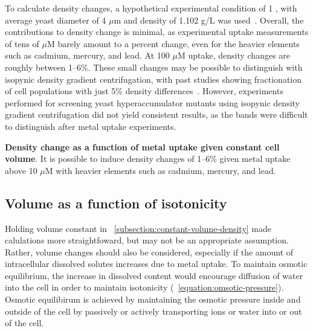 \documentclass[../main/main]{subfiles}
\begin{document}
To calculate density changes, a hypothetical experimental condition of 1 \OD{}, with average yeast diameter of 4 $\mu$m and density of 1.102 g/L was used~\cite{bryan2010measurement}. Overall, the contributions to density change is minimal, as experimental uptake measurements of tens of $\mu$M barely amount to a percent change, even for the heavier elements such as cadmium, mercury, and lead. At 100 $\mu$M uptake, density changes are roughly between 1--6\%. These small changes may be possible to distinguish with isopynic density gradient centrifugation, with past studies showing fractionation of cell populations with just 5\% density differences~\cite{baldwin1984,kjeldsen1999subcellular}. However, experiments performed for screening yeast hyperaccumulator mutants using isopynic density gradient centrifugation did not yield consistent results, as the bands were difficult to distinguish after metal uptake experiments.

\begin{table}[H]
	\centering
	
	\caption[Density change as a function of metal uptake given constant cell volume]
	{
		\textbf{Density change as a function of metal uptake given constant cell volume}.
		It is possible to induce density changes of 1--6\% given metal uptake above 10 $\mu$M with heavier elements such as cadmium, mercury, and lead.
	}
\end{table}

\subsection*{Volume as a function of isotonicity}
Holding volume constant in \SECTION~\ref{subsection:constant-volume-density} made calulations more straightfoward, but may not be an appropriate assumption. Rather, volume changes should also be considered, especially if the amount of intracellular dissolved solutes increases due to metal uptake. To maintain osmotic equilibrium, the increase in dissolved content would encourage diffusion of water into the cell in order to maintain isotonicity (\EQUATION~\ref{equation:omsotic-pressure}). Osmotic equilibirum is achieved by maintaining the osmotic pressure inside and outside of the cell by passively or actively transporting ions or water into or out of the cell.
\end{document}
